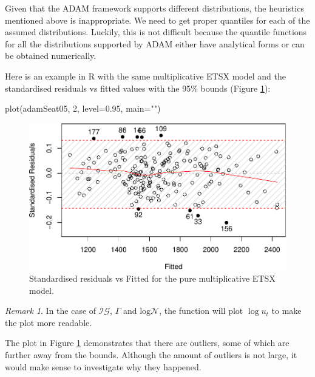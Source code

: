\documentclass[
]{book}
\newenvironment{Shaded}{\begin{snugshade}}{\end{snugshade}}
\newcommand{\AttributeTok}[1]{\textcolor[rgb]{0.77,0.63,0.00}{#1}}
\newcommand{\DecValTok}[1]{\textcolor[rgb]{0.00,0.00,0.81}{#1}}
\newcommand{\FloatTok}[1]{\textcolor[rgb]{0.00,0.00,0.81}{#1}}
\newcommand{\FunctionTok}[1]{\textcolor[rgb]{0.00,0.00,0.00}{#1}}
\newcommand{\NormalTok}[1]{#1}
\newcommand{\StringTok}[1]{\textcolor[rgb]{0.31,0.60,0.02}{#1}}
\theoremstyle{definition}
\theoremstyle{definition}
\theoremstyle{definition}
\theoremstyle{definition}
\theoremstyle{remark}
\newtheorem*{remark}{Remark}
\begin{document}
Given that the ADAM framework supports different distributions, the heuristics mentioned above is inappropriate. We need to get proper quantiles for each of the assumed distributions. Luckily, this is not difficult because the quantile functions for all the distributions supported by ADAM either have analytical forms or can be obtained numerically.

Here is an example in R with the same multiplicative ETSX model and the standardised residuals vs fitted values with the 95\% bounds (Figure \ref{fig:adamSeat05ResidFitted}):

\begin{Shaded}
\begin{Highlighting}[]
\FunctionTok{plot}\NormalTok{(adamSeat05, }\DecValTok{2}\NormalTok{, }\AttributeTok{level=}\FloatTok{0.95}\NormalTok{, }\AttributeTok{main=}\StringTok{""}\NormalTok{)}
\end{Highlighting}
\end{Shaded}

\begin{figure}
\centering
\includegraphics{Svetunkov--2022----ADAM_files/figure-latex/adamSeat05ResidFitted-1.pdf}
\caption{\label{fig:adamSeat05ResidFitted}Standardised residuals vs Fitted for the pure multiplicative ETSX model.}
\end{figure}

\begin{remark}
In the case of \(\mathcal{IG}\), \(\Gamma\) and \(\mathrm{log}\mathcal{N}\), the function will plot \(\log u_t\) to make the plot more readable.
\end{remark}

The plot in Figure \ref{fig:adamSeat05ResidFitted} demonstrates that there are outliers, some of which are further away from the bounds. Although the amount of outliers is not large, it would make sense to investigate why they happened.
\end{document}
